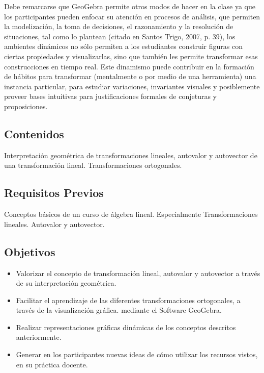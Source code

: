 Debe remarcarse que GeoGebra permite otros modos de hacer en la clase ya que los participantes pueden enfocar su atención en procesos de análisis, que permiten la modelización, la toma de decisiones, el razonamiento y la resolución de situaciones, tal como lo plantean \textcite{arcavi2000} (citado en Santos Trigo, 2007, p. 39), los ambientes dinámicos no sólo permiten a los estudiantes construir figuras con ciertas propiedades y visualizarlas, sino que también les permite transformar esas construcciones en tiempo real. Este dinamismo puede contribuir en la formación de hábitos para transformar (mentalmente o por medio de una herramienta) una instancia particular, para estudiar variaciones, invariantes visuales y posiblemente proveer bases intuitivas para justificaciones formales de conjeturas y proposiciones.

\subsection{Contenidos}

Interpretación geométrica de transformaciones lineales, autovalor y autovector de una transformación lineal. Transformaciones ortogonales. 

\subsection{Requisitos Previos}

Conceptos básicos de un curso de álgebra lineal. Especialmente Transformaciones lineales. Autovalor y autovector.

\subsection{Objetivos}
\begin{itemize}
	\item Valorizar el concepto de transformación lineal, autovalor y autovector a través de su interpretación geométrica.
	\item Facilitar el aprendizaje de las diferentes transformaciones ortogonales, a través de la visualización gráfica. mediante el Software GeoGebra.
	\item Realizar representaciones gráficas dinámicas de los conceptos descritos anteriormente.
	\item Generar en los participantes nuevas ideas de cómo utilizar los recursos vistos, en su práctica docente.
\end{itemize}

